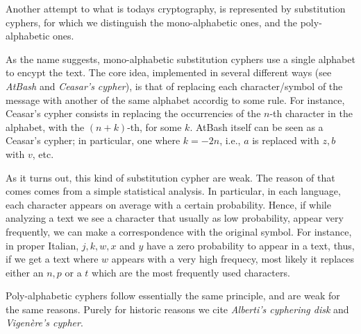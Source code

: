 \documentclass{subfiles}
\begin{document}
    Another attempt to what is todays cryptography, 
        is represented by substitution cyphers, for which we distinguish the mono-alphabetic ones,
        and the poly-alphabetic ones. 

    As the name suggests, mono-alphabetic substitution cyphers use a single alphabet to encypt the text.
        The core idea, implemented in several different ways (see \emph{AtBash} and \emph{Ceasar's cypher}),
        is that of replacing each character/symbol of the message with another of the same alphabet
        accordig to some rule. 
        For instance, Ceasar's cypher consists in replacing the occurrencies of the $n$-th character
        in the alphabet, with the $(n + k)$-th, for some $k$.
        AtBash itself can be seen as a Ceasar's cypher; in particular, one where $k = -2n$,
        i.e., $a$ is replaced with $z, b$ with $v$, etc.

    As it turns out, this kind of substitution cypher are weak.
        The reason of that comes comes from a simple statistical analysis.
        In particular, in each language, each character appears on average with a certain probability.
        Hence, if while analyzing a text we see a character that usually as low probability,
        appear very frequently, we can make a correspondence with the original symbol.
        For instance, in proper Italian, $j, k, w, x$ and $y$ have a zero probability to appear 
        in a text, thus, if we get a text where $w$ appears with a very high frequecy,
        most likely it replaces either an $n, p$ or a $t$ which are the most frequently used characters.

    Poly-alphabetic cyphers follow essentially the same principle, and are weak for the same reasons.
        Purely for historic reasons we cite \emph{Alberti's cyphering disk} and \emph{Vigen{\`e}re's cypher}.
\end{document}

